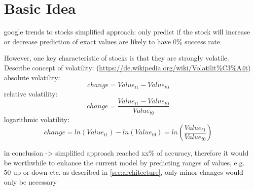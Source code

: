 \section{Basic Idea}
\label{sec:idea}

google trends to stocks
simplified approach: only predict if the stock will increase or decrease
prediction of exact values are likely to have 0\% success rate

However, one key characteristic of stocks is that they are strongly volatile. 
Describe concept of volatility: (\url{https://de.wikipedia.org/wiki/Volatilit%C3%A4t})
absolute volatility:
\begin{equation}
	change = Value_{t1} - Value_{t0}
\end{equation}
relative volatility:
\begin{equation}
change = \frac{Value_{t1} - Value_{t0}}{Value_{t0}}
\end{equation}
logarithmic volatility:
\begin{equation}
change = ln(Value_{t1}) - ln(Value_{t0}) = ln(\frac{Value_{t1}}{Value_{t0}})
\end{equation}


in conclusion -> simplified approach reached xx\% of accuracy, therefore it would be worthwhile to enhance the current model by predicting ranges of values, e.g. 50 up or down etc.
as described in \ref{sec:architecture}, only minor changes would only be necessary